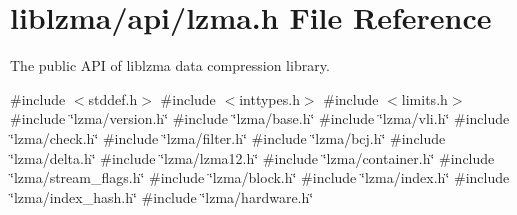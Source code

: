 \section{liblzma/api/lzma.h File Reference}
\label{lzma_8h}


The public A\+PI of liblzma data compression library.  


{\ttfamily \#include $<$stddef.\+h$>$}\newline
{\ttfamily \#include $<$inttypes.\+h$>$}\newline
{\ttfamily \#include $<$limits.\+h$>$}\newline
{\ttfamily \#include \char`\"{}lzma/version.\+h\char`\"{}}\newline
{\ttfamily \#include \char`\"{}lzma/base.\+h\char`\"{}}\newline
{\ttfamily \#include \char`\"{}lzma/vli.\+h\char`\"{}}\newline
{\ttfamily \#include \char`\"{}lzma/check.\+h\char`\"{}}\newline
{\ttfamily \#include \char`\"{}lzma/filter.\+h\char`\"{}}\newline
{\ttfamily \#include \char`\"{}lzma/bcj.\+h\char`\"{}}\newline
{\ttfamily \#include \char`\"{}lzma/delta.\+h\char`\"{}}\newline
{\ttfamily \#include \char`\"{}lzma/lzma12.\+h\char`\"{}}\newline
{\ttfamily \#include \char`\"{}lzma/container.\+h\char`\"{}}\newline
{\ttfamily \#include \char`\"{}lzma/stream\+\_\+flags.\+h\char`\"{}}\newline
{\ttfamily \#include \char`\"{}lzma/block.\+h\char`\"{}}\newline
{\ttfamily \#include \char`\"{}lzma/index.\+h\char`\"{}}\newline
{\ttfamily \#include \char`\"{}lzma/index\+\_\+hash.\+h\char`\"{}}\newline
{\ttfamily \#include \char`\"{}lzma/hardware.\+h\char`\"{}}\newline
